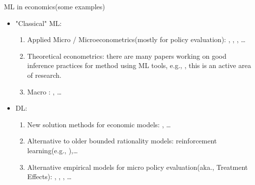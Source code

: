 \documentclass[notes, ignorenonframetext, compress, 10pt, xcolor=svgnames, aspectratio=169]{beamer}
\begin{document}
\begin{frame}
[allowframebreaks]{ML in economics(some examples)}

\begin{itemize}
\item "Classical" ML:
\begin{enumerate}[$\cdot$]
\item Applied Micro / Microeconometrics(mostly for policy evaluation): \cite{MullainathanSpiessJEP2017},  \cite{AtheyImbensARE2019}, \cite{GentzkowEtalEcta2019}, \ldots 
\item Theoretical econometrics: there are many papers working on good inference practices for method using ML tools, e.g., \cite{ChernozhukovEtalAER2017}, this is an active area of research.
\item Macro : \cite{CoulombeEtalJAE2022}, \ldots 
\end{enumerate}
\item DL:
 \begin{enumerate}[$\cdot$]
 \item New solution methods for economic models: \cite{AzinovicEtalIER2022}, \ldots
\item Alternative to older bounded rationality models: reinforcement learning(e.g., \citep{FinanPouzoArxiv2021}),\ldots
\item Alternative empirical models for micro policy evaluation(aka., Treatment Effects): \cite{ChernozhukovEtalArxiv2021}, \cite{HartfordEtalProced2017}, \cite{FarreletalECTA16901}, \ldots
\end{enumerate}
\end{itemize}
\end{frame}
\end{document}

